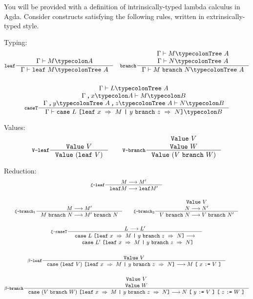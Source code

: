 \documentclass{examhons2018}
\begin{document}
\begin{enumerate}
You will be provided with a definition of intrinsically-typed lambda
calculus in Agda. Consider constructs satisfying the following rules,
written in extrinsically-typed style.

Typing:
\begin{gather*}
  \inference[\leaf]
    {\Gamma \vdash M \typecolon A}
    {\Gamma \vdash \leaf~M \typecolon \Tree~A}
\quad
  \inference[\branch]
    {\Gamma \vdash M \typecolon \Tree~A \\
     \Gamma \vdash N \typecolon \Tree~A}
    {\Gamma \vdash M~\branch~N \typecolon \Tree~A}
\\~\\
  \inference[\CASET]
    {\Gamma \vdash L \typecolon \Tree~A \\
     \Gamma \comma x \typecolon A \vdash M \typecolon B \\
     \Gamma \comma y \typecolon \Tree~A \comma z \typecolon \Tree~A \vdash N \typecolon B}
    {\Gamma \vdash \caseT{L}{x}{M}{y}{z}{N} \typecolon B}
\end{gather*}

Values:
\begin{gather*}
\inference[\V\dash\leaf]
  {\Value~V}
  {\Value~(\leaf~V)}
\qquad
\inference[\V\dash\branch]
  {\Value~V \\
   \Value~W}
  {\Value~(V~\branch~W)}
\end{gather*}

Reduction:
\begin{gather*}
\inference[$\xi\dash\leaf$]
  {M \becomes M'}
  {\leaf{M} \becomes \leaf{M'}}
\\~\\
\inference[$\xi\dash\branch_1$]
  {M \becomes M'}
  {M~\branch~N \becomes M'~\branch~N}
\qquad
\inference[$\xi\dash\branch_2$]
  {\Value~V \\
   N \becomes N'}
  {V~\branch~N \becomes V~\branch~N'}
\\~\\
\inference[$\xi\dash\CASET$]
  {L \becomes L'}
  {\begin{array}{c}
     \caseT{L}{x}{M}{y}{z}{N} \becomes \\
     {} \quad \caseT{L'}{x}{M}{y}{z}{N}
   \end{array}}
\\~\\
\inference[$\beta\dash\leaf$]
  {\Value~V}
  {\caseT{(\leaf~V)}{x}{M}{y}{z}{N} \becomes \subst{M}{x}{V}}
\\~\\
\inference[$\beta\dash\branch$]
  {\Value~V \\
   \Value~W}
  {\caseT{(V~\branch~W)}{x}{M}{y}{z}{N} \becomes \subst{\subst{N}{y}{V}}{z}{W}}
\end{gather*}


\end{enumerate}
\end{document}
